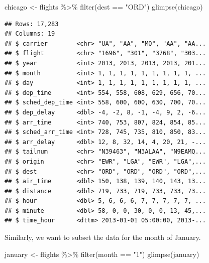 \documentclass[
]{book}
\newenvironment{Shaded}{\begin{snugshade}}{\end{snugshade}}
\newcommand{\FunctionTok}[1]{\textcolor[rgb]{0.00,0.00,0.00}{#1}}
\newcommand{\NormalTok}[1]{#1}
\newcommand{\OtherTok}[1]{\textcolor[rgb]{0.56,0.35,0.01}{#1}}
\newcommand{\SpecialCharTok}[1]{\textcolor[rgb]{0.00,0.00,0.00}{#1}}
\newcommand{\StringTok}[1]{\textcolor[rgb]{0.31,0.60,0.02}{#1}}
\begin{document}
\begin{Shaded}
\begin{Highlighting}[]
\NormalTok{chicago }\OtherTok{\textless{}{-}}\NormalTok{ flights }\SpecialCharTok{\%\textgreater{}\%} 
  \FunctionTok{filter}\NormalTok{(dest }\SpecialCharTok{==} \StringTok{"ORD"}\NormalTok{)}
\FunctionTok{glimpse}\NormalTok{(chicago)}
\end{Highlighting}
\end{Shaded}

\begin{verbatim}
## Rows: 17,283
## Columns: 19
## $ carrier        <chr> "UA", "AA", "MQ", "AA", "AA...
## $ flight         <chr> "1696", "301", "3768", "303...
## $ year           <int> 2013, 2013, 2013, 2013, 201...
## $ month          <int> 1, 1, 1, 1, 1, 1, 1, 1, 1, ...
## $ day            <int> 1, 1, 1, 1, 1, 1, 1, 1, 1, ...
## $ dep_time       <int> 554, 558, 608, 629, 656, 70...
## $ sched_dep_time <int> 558, 600, 600, 630, 700, 70...
## $ dep_delay      <dbl> -4, -2, 8, -1, -4, 9, 2, -6...
## $ arr_time       <int> 740, 753, 807, 824, 854, 85...
## $ sched_arr_time <int> 728, 745, 735, 810, 850, 83...
## $ arr_delay      <dbl> 12, 8, 32, 14, 4, 20, 21, -...
## $ tailnum        <chr> "N39463", "N3ALAA", "N9EAMQ...
## $ origin         <chr> "EWR", "LGA", "EWR", "LGA",...
## $ dest           <chr> "ORD", "ORD", "ORD", "ORD",...
## $ air_time       <dbl> 150, 138, 139, 140, 143, 13...
## $ distance       <dbl> 719, 733, 719, 733, 733, 73...
## $ hour           <dbl> 5, 6, 6, 6, 7, 7, 7, 7, 7, ...
## $ minute         <dbl> 58, 0, 0, 30, 0, 0, 13, 45,...
## $ time_hour      <dttm> 2013-01-01 05:00:00, 2013-...
\end{verbatim}

Similarly, we want to subset the data for the month of January.

\begin{Shaded}
\begin{Highlighting}[]
\NormalTok{january }\OtherTok{\textless{}{-}}\NormalTok{ flights }\SpecialCharTok{\%\textgreater{}\%} 
  \FunctionTok{filter}\NormalTok{(month }\SpecialCharTok{==} \StringTok{"1"}\NormalTok{)}
\FunctionTok{glimpse}\NormalTok{(january)}
\end{Highlighting}
\end{Shaded}
\end{document}
